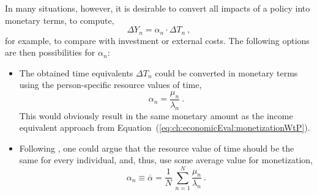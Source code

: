 %
In many situations, however, it is desirable to convert all impacts of a policy into monetary terms, \ie to compute,
\begin{equation}
\Delta Y_n = \alpha_n \cdot \Delta T_n \ ,
\label{eq:ch:economicEval:monetizationTime2Money}
\end{equation}
for example,  to compare with investment or external costs.  The following options are then possibilities for $\alpha_n$:
\begin{itemize}\styleItemize

\item
The obtained time equivalents $\Delta T_n$ could be converted in monetary terms using the person-specific resource values of time, \ie
\begin{equation}
\alpha_n = \frac{\mu_n}{\lambda_n} \ .
\label{eq:time2money-by-resource-VoT}
\end{equation}
%
This would obviously result in the same monetary amount as the income equivalent approach from Equation~(\ref{eq:ch:economicEval:monetizationWtP}). 
%
%

\item
Following \citet{MackieWorsley2013ComparisonTransportAppraisal}, one could argue that 
the resource value of time should be the same for every individual,
and, thus, use some average 
value for monetization, \eg 
\[
\alpha_n \equiv \overline\alpha = \frac{1}{N} \, \sum_{n=1}^N \frac{\mu_n}{\lambda_n} \ .
\]


\end{itemize}
